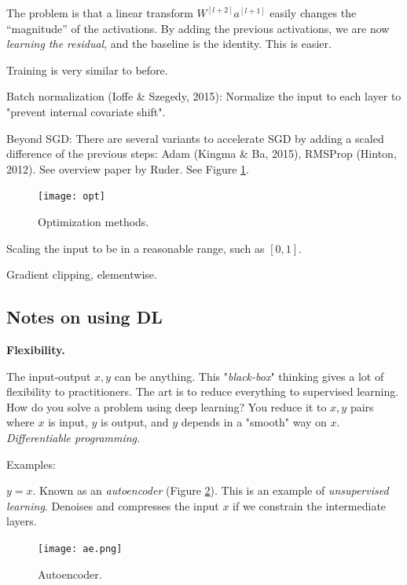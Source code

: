 \documentclass[english]{article}
\begin{document}
The problem is that a linear transform $W^{[l+2]}a^{[l+1]}$ easily changes the ``magnitude'' of the activations. By adding the previous activations, we are now \emph{learning the residual}, and the baseline is the identity. This is easier. 

Training is very similar to before. 

\item Batch normalization (Ioffe \& Szegedy, 2015): Normalize the input to each layer to "prevent internal covariate shift".

\item Beyond SGD: There are several variants to accelerate SGD by adding a scaled difference of the previous steps: Adam (Kingma \& Ba, 2015), RMSProp (Hinton, 2012). See overview paper by Ruder. See Figure \ref{opt}.

\begin{figure}
  \centering
  \texttt{[image: opt]}
  \caption{Optimization methods.}
  \label{opt}
\end{figure}



\item Scaling the input to be in a reasonable range, such as $[0,1]$.

\item Gradient clipping, elementwise. 


\eenum

\subsection{Notes on using DL}
\benum


\item  {\bf Flexibility.}

The input-output $x,y$ can be anything. This "\emph{black-box}" thinking gives a lot of flexibility to practitioners. The art is to reduce everything to supervised learning. How do you solve a problem using deep learning? You reduce it to $x,y$ pairs where $x$ is input, $y$ is output, and $y$ depends in a "smooth" way on $x$. \emph{Differentiable programming.}

 Examples:

\benum

\item
$y = x$. Known as an \emph{autoencoder} (Figure \ref{ae}). This is an example of \emph{unsupervised learning}. Denoises and compresses the input $x$ if we constrain the intermediate layers. 

\begin{figure}
  \centering
  \texttt{[image: ae.png]}
  \caption{Autoencoder.}
  \label{ae}
\end{figure}
\end{document}

